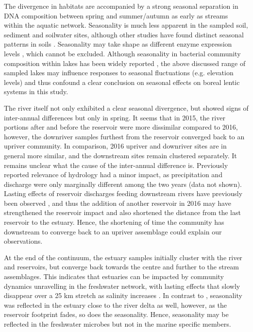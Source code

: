 \documentclass[12pt,a4paper]{article} %
\begin{document}
The divergence in habitats are accompanied by a strong seasonal separation in DNA composition between spring and summer/autumn as early as streams within the aquatic network. Seasonality is much less apparent in the sampled soil, sediment and soilwater sites, although other studies have found distinct seasonal patterns in soils \citep{Shigyo2019, Rasche2011c}. Seasonality may take shape as different enzyme expression levels \citep{Kaiser2010c}, which cannot be excluded. Although seasonality in bacterial community composition within lakes has been widely reported \citep{Crump2003, Kara2013, Nino-Garcia2017a}, the above discussed range of sampled lakes may influence responses to seasonal fluctuations (e.g. elevation levels) and thus confound a clear conclusion on seasonal effects on boreal lentic systems in this study.

The river itself not only exhibited a clear seasonal divergence, but showed signs of inter-annual differences but only in spring. It seems that in 2015, the river portions after and before the reservoir were more dissimilar compared to 2016, however, the downriver samples furthest from the reservoir converged back to an upriver community. In comparison, 2016 upriver and downriver sites are in general more similar, and the downstream sites remain clustered separately. It remains unclear what the cause of the inter-annual difference is. Previously reported relevance of hydrology \citep{Nino-Garcia2016} had a minor impact, as precipitation and discharge were only marginally different among the two years (data not shown). Lasting effects of reservoir discharges feeding downstream rivers have previously been observed \citep{Ruiz-Gonzalez2013, Ruiz-Gonzalez2015a, Reis2020}, and thus the addition of another reservoir in 2016 may have strengthened the reservoir impact and also shortened the distance from the last reservoir to the estuary. Hence, the shortening of time the community has downstream to converge back to an upriver assemblage could explain our observations.

At the end of the continuum, the estuary samples initially cluster with the river and reservoirs, but converge back towards the centre and further to the stream assemblages. This indicates that estuaries can be impacted by community dynamics unravelling in the freshwater network, with lasting effects \citep{Hauptmann2016} that slowly disappear over a 25 km stretch as salinity increases \citep{Bouvier2002, Crump2004}. In contrast to \citet{Doherty2017}, seasonality was reflected in the estuary close to the river delta as well, however, as the reservoir footprint fades, so does the seasonality. Hence, seasonality may be reflected in the freshwater microbes but not in the marine specific members.
\end{document}
